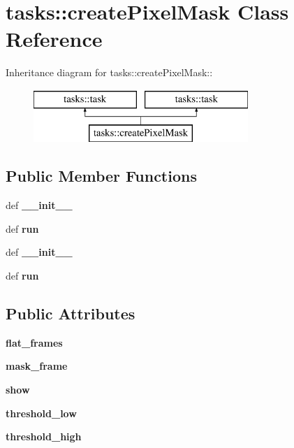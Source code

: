 \section{tasks::create\-Pixel\-Mask Class Reference}
\label{classtasks_1_1createPixelMask}
Inheritance diagram for tasks::create\-Pixel\-Mask::\begin{figure}[H]
\begin{center}
\leavevmode
\includegraphics[height=2cm]{classtasks_1_1createPixelMask}
\end{center}
\end{figure}
\subsection*{Public Member Functions}
\begin{CompactItemize}
\item 
def \textbf{\_\-\_\-init\_\-\_\-}\label{classtasks_1_1createPixelMask_5291383e7bef60685ff06969dcafe1e6}

\item 
def \textbf{run}\label{classtasks_1_1createPixelMask_a017aa45a6ae62a2797bd64df50596c5}

\item 
def \textbf{\_\-\_\-init\_\-\_\-}\label{classtasks_1_1createPixelMask_5291383e7bef60685ff06969dcafe1e6}

\item 
def \textbf{run}\label{classtasks_1_1createPixelMask_a017aa45a6ae62a2797bd64df50596c5}

\end{CompactItemize}
\subsection*{Public Attributes}
\begin{CompactItemize}
\item 
\textbf{flat\_\-frames}\label{classtasks_1_1createPixelMask_b61f6534deea9ae13db194b3138d4f5b}

\item 
\textbf{mask\_\-frame}\label{classtasks_1_1createPixelMask_d7d69a6471922a552a93480fd367c18c}

\item 
\textbf{show}\label{classtasks_1_1createPixelMask_2ba08960b1bb79bd7bfc7df0c5ab7570}

\item 
\textbf{threshold\_\-low}\label{classtasks_1_1createPixelMask_8de0762453ddc0788ad0eb753f8e63bd}

\item 
\textbf{threshold\_\-high}\label{classtasks_1_1createPixelMask_8f25a59374ca0ea1ba5ab0a7fa438c23}

\end{CompactItemize}
